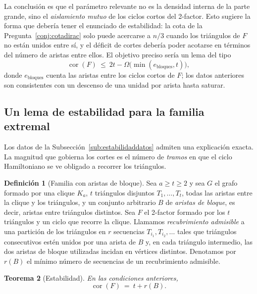 \documentclass[11pt,a4paper]{article}
\newtheorem{teorema}{Teorema}[section]
\theoremstyle{definition}
\newtheorem{definicion}[teorema]{Definición}
\theoremstyle{remark}
\begin{document}
La conclusión es que el parámetro relevante no es la densidad interna de la parte grande, sino el \emph{aislamiento mutuo} de los ciclos cortos del 2-factor. Esto sugiere la forma que debería tener el enunciado de estabilidad: la cota de la Pregunta~\ref{conj:cotadirac} solo puede acercarse a $n/3$ cuando los triángulos de $F$ no están unidos entre sí, y el déficit de cortes debería poder acotarse en términos del número de aristas entre ellos. El objetivo preciso sería un lema del tipo
\[
\operatorname{cor}(F)\ \le\ 2t-\Omega\big(\min(e_{\mathrm{bloques}},t)\big),
\]
donde $e_{\mathrm{bloques}}$ cuenta las aristas entre los ciclos cortos de $F$; los datos anteriores son consistentes con un descenso de una unidad por arista hasta saturar.



\subsection{Un lema de estabilidad para la familia extremal}\label{sub:lemaestabilidad}

Los datos de la Subsección~\ref{sub:estabilidaddatos} admiten una explicación exacta. La magnitud que gobierna los cortes es el número de \emph{tramos} en que el ciclo Hamiltoniano se ve obligado a recorrer los triángulos.

\begin{definicion}[Familia con aristas de bloque]
Sea $a\ge t\ge2$ y sea $G$ el grafo formado por una clique $K_a$, $t$ triángulos disjuntos $T_1,\dots,T_t$, todas las aristas entre la clique y los triángulos, y un conjunto arbitrario $B$ de \emph{aristas de bloque}, es decir, aristas entre triángulos distintos. Sea $F$ el 2-factor formado por los $t$ triángulos y un ciclo que recorre la clique. Llamamos \emph{recubrimiento admisible} a una partición de los triángulos en $r$ secuencias $T_{i_1},T_{i_2},\dots$ tales que triángulos consecutivos estén unidos por una arista de $B$ y, en cada triángulo intermedio, las dos aristas de bloque utilizadas incidan en vértices distintos. Denotamos por $r(B)$ el mínimo número de secuencias de un recubrimiento admisible.
\end{definicion}

\begin{teorema}[Estabilidad]\label{thm:estabilidad}
En las condiciones anteriores,
\[
\operatorname{cor}(F)\ =\ t+r(B).
\]
\end{teorema}
\end{document}
